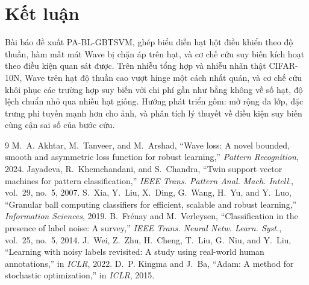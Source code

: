 \documentclass[11pt,a4paper]{article}
\begin{document}
\section{Kết luận}
\label{sec:conclusion}
Bài báo đề xuất PA-BL-GBTSVM, ghép biểu diễn hạt hột điều khiển theo độ thuần, hàm mất mát Wave bị chặn áp trên hạt, và cơ chế cứu suy biến kích hoạt theo điều kiện quan sát được. Trên nhiễu tổng hợp và nhiễu nhãn thật CIFAR-10N, Wave trên hạt độ thuần cao vượt hinge một cách nhất quán, và cơ chế cứu khôi phục các trường hợp suy biến với chi phí gần như bằng không về số hạt, độ lệch chuẩn nhỏ qua nhiều hạt giống. Hướng phát triển gồm: mở rộng đa lớp, đặc trưng phi tuyến mạnh hơn cho ảnh, và phân tích lý thuyết về điều kiện suy biến cùng cận sai số của bước cứu.

\begin{thebibliography}{9}
 M.~A. Akhtar, M.~Tanveer, and M.~Arshad, ``Wave loss: A novel bounded, smooth and asymmetric loss function for robust learning,'' \emph{Pattern Recognition}, 2024.
 Jayadeva, R.~Khemchandani, and S.~Chandra, ``Twin support vector machines for pattern classification,'' \emph{IEEE Trans. Pattern Anal. Mach. Intell.}, vol.~29, no.~5, 2007.
 S.~Xia, Y.~Liu, X.~Ding, G.~Wang, H.~Yu, and Y.~Luo, ``Granular ball computing classifiers for efficient, scalable and robust learning,'' \emph{Information Sciences}, 2019.
 B.~Fr\'enay and M.~Verleysen, ``Classification in the presence of label noise: A survey,'' \emph{IEEE Trans. Neural Netw. Learn. Syst.}, vol.~25, no.~5, 2014.
 J.~Wei, Z.~Zhu, H.~Cheng, T.~Liu, G.~Niu, and Y.~Liu, ``Learning with noisy labels revisited: A study using real-world human annotations,'' in \emph{ICLR}, 2022.
 D.~P. Kingma and J.~Ba, ``Adam: A method for stochastic optimization,'' in \emph{ICLR}, 2015.
\end{thebibliography}
\end{document}
